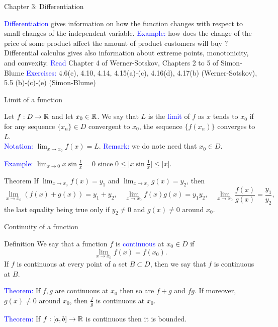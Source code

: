 \documentclass[11pt,aspectratio=169]{beamer}
\begin{document}
\begin{frame}{Chapter 3: Differentiation}

 \textcolor{blue}{Differentiation} gives information on how the function changes with respect to small changes of the independent variable.
\vskip 12pt
\textcolor{blue}{Example:} how does the change of the price of some product affect the amount of product customers will buy ?
\vskip 12pt
Differential calculus gives also information about extreme points, monotonicity, and convexity.
\vskip 12pt
\textcolor{blue}{Read} Chapter 4 of Werner-Sotskov, Chapters 2 to 5 of Simon-Blume
\vskip 12pt
\textcolor{blue}{Exercises:} 4.6(c), 4.10, 4.14, 4.15(a)-(c), 4.16(d), 4.17(b) (Werner-Sotskov), 5.5 (b)-(c)-(e) (Simon-Blume)
\end{frame}


\begin{frame}{Limit of a function}
\begin{alertblock}{}
Let $f:D  \rightarrow \mathbb R$ and let $x_0 \in \mathbb R$. We say that $L$ is the \textcolor{blue}{limit} of $f$ as $x$ tends to $x_0$ if for any sequence $\{x_n\} \in D$ convergent to $x_0$, the sequence
$\{f(x_n)\}$ converges to $L$. 	\\[3mm]
\textcolor{blue}{Notation:} $\lim_{x \rightarrow x_0} f(x)=L$. \textcolor{blue}{Remark:} we do note need that $x_0 \in D$.
\end{alertblock}
 \textcolor{blue}{Example:} $\lim_{x \rightarrow 0} x \sin\frac{1}{x}=0$ since $0\leq \vert x \sin\frac{1}{x}\vert \leq \vert x \vert$.
\begin{block}{Theorem}
	If $\lim_{x \rightarrow x_0} f(x)=y_1$ and $\lim_{x \rightarrow x_0} g(x)=y_2$,
then $$\lim_{x \rightarrow x_0} (f(x)+g(x))=y_1+y_2, \quad\lim_{x \rightarrow x_0} f(x)g(x)=y_1y_2,
\quad\lim_{x \rightarrow x_0} \frac{f(x)}{g(x)}=\frac{y_1}{y_2},$$
the last equality being true only if $y_2\neq0$ and $g(x) \neq 0$ around $x_0$.
\end{block}
\end{frame}

\begin{frame}{Continuity of a function}

\begin{alertblock}{Definition}
We say that a function $f$ is \textcolor{blue}{continuous}
at $x_0 \in D$ if $$\lim_{x \rightarrow x_0} f(x)=f(x_0).$$
If $f$ is continuous at every point of a set $B\subset D$, then we say that $f$ is continuous
at $B$.	
\end{alertblock}

\textcolor{blue}{Theorem:} If $f,g$ are continuous at $x_0$ then so are $f+g$ and $f g$. If moreover,
$g(x)\neq 0$ around $x_0$, then $\frac{f}{g}$ is continuous at $x_0$.

\vskip 12pt
\textcolor{blue}{Theorem:} If $f:[a,b] \rightarrow \mathbb R$ is continuous then it is bounded.
\end{frame}
\end{document}
